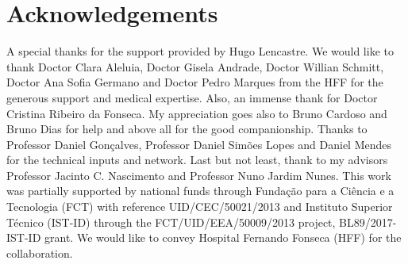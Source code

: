 
\section{Acknowledgements}
\label{sec:sec012}

A special thanks for the support provided by Hugo Lencastre. We would like to thank Doctor Clara Aleluia, Doctor Gisela Andrade, Doctor Willian Schmitt, Doctor Ana Sofia Germano and Doctor Pedro Marques from the HFF for the generous support and medical expertise. Also, an immense thank for Doctor Cristina Ribeiro da Fonseca. My appreciation goes also to Bruno Cardoso and Bruno Dias for help and above all for the good companionship. Thanks to Professor Daniel Gon\c{c}alves, Professor Daniel Sim\~{o}es Lopes and Daniel Mendes for the technical inputs and network. Last but not least, thank to my advisors Professor Jacinto C. Nascimento and Professor Nuno Jardim Nunes. This work was partially supported by national funds through Funda\c{c}\~{a}o para a Ci\^{e}ncia e a Tecnologia (FCT) with reference UID/CEC/50021/2013 and Instituto Superior T\'{e}cnico (IST-ID) through the FCT/UID/EEA/50009/2013 project, BL89/2017-IST-ID grant. We would like to convey Hospital Fernando Fonseca (HFF) for the collaboration.